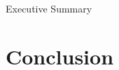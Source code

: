 \documentclass[12pt]{article}
\begin{document}
    

    \pagebreak

    

    Executive Summary

    \pagebreak

    \tableofcontents

    \pagebreak

    

    

    \pagebreak

    \section{Conclusion}

    \pagebreak

    
\end{document}
